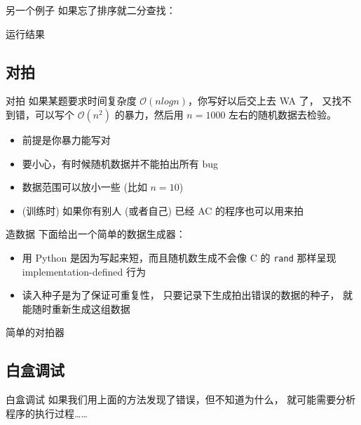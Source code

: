\documentclass[10pt,mathserif]{beamer}
\begin{document}
\begin{frame}{另一个例子}
	如果忘了排序就二分查找：
	
\end{frame}

\begin{frame}{运行结果}
	
\end{frame}

\subsection{对拍}
\begin{frame}{对拍}
	如果某题要求时间复杂度 $\mathcal{O}(nlogn)$，你写好以后交上去 WA 了，
	又找不到错，可以写个 $\mathcal{O}(n^2)$ 的暴力，然后用 $n = 1000$
	左右的随机数据去检验。
	\begin{itemize}
		\item 前提是你暴力能写对
		\item 要小心，有时候随机数据并不能拍出所有 bug
		\item 数据范围可以放小一些 (比如 $n = 10$)
		\item (训练时) 如果你有别人 (或者自己) 已经 AC 的程序也可以用来拍
	\end{itemize}
\end{frame}

\begin{frame}{造数据}
	下面给出一个简单的数据生成器：
	
	\begin{itemize}
		\item 用 Python 是因为写起来短，而且随机数生成不会像 C 的
			\lstinline{rand} 那样呈现 implementation-defined 行为
		\item 读入种子是为了保证可重复性，
			只要记录下生成拍出错误的数据的种子，
			就能随时重新生成这组数据
	\end{itemize}
\end{frame}

\begin{frame}{简单的对拍器}
	
\end{frame}

\subsection{白盒调试}
\begin{frame}{白盒调试}
	如果我们用上面的方法发现了错误，但不知道为什么，
	就可能需要分析程序的执行过程……
\end{frame}
\end{document}
